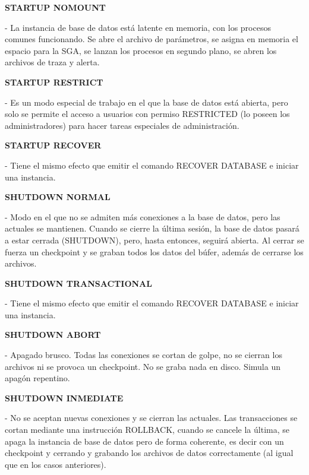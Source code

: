 \documentclass[12pt,letterpaper]{article}
\begin{document}
\textbf{STARTUP NOMOUNT} \ 
\begin{itemize}
- La instancia de base de datos está latente en memoria, con los procesos comunes funcionando. Se abre el archivo de parámetros, se asigna en memoria el espacio para la SGA, se lanzan los procesos en segundo plano, se abren los archivos de traza y alerta.\\
\end{itemize} 



\textbf{STARTUP RESTRICT} \ 
\begin{itemize}
- Es un modo especial de trabajo en el que la base de datos está abierta, pero solo se permite el acceso a usuarios con permiso RESTRICTED (lo poseen los administradores) para hacer tareas especiales de administración.\\
\end{itemize} 

\textbf{STARTUP RECOVER} \ 
\begin{itemize}
- Tiene el mismo efecto que emitir el comando RECOVER DATABASE e iniciar una instancia.\\
\end{itemize} 

\textbf{SHUTDOWN NORMAL} \ 
\begin{itemize}
- Modo en el que no se admiten más conexiones a la base de datos, pero las actuales se mantienen. Cuando se cierre la última sesión, la base de datos pasará a estar cerrada (SHUTDOWN), pero, hasta entonces, seguirá abierta. Al cerrar se fuerza un checkpoint y se graban todos los datos del búfer, además de cerrarse los archivos.\\
\end{itemize}


\textbf{SHUTDOWN TRANSACTIONAL} \ 
\begin{itemize}
- Tiene el mismo efecto que emitir el comando RECOVER DATABASE e iniciar una instancia.\\
\end{itemize} 

\textbf{SHUTDOWN ABORT} \ 
\begin{itemize}
- Apagado brusco. Todas las conexiones se cortan de golpe, no se cierran los archivos ni se provoca un checkpoint. No se graba nada en disco. Simula un apagón repentino.
\end{itemize}

\textbf{SHUTDOWN INMEDIATE} \ 
\begin{itemize}
- No se aceptan nuevas conexiones y se cierran las actuales. Las transacciones se cortan mediante una instrucción ROLLBACK, cuando se cancele la última, se apaga la instancia de base de datos pero de forma coherente, es decir con un checkpoint y cerrando y grabando los archivos de datos correctamente (al igual que en los casos anteriores).
\end{itemize}
\end{document}
